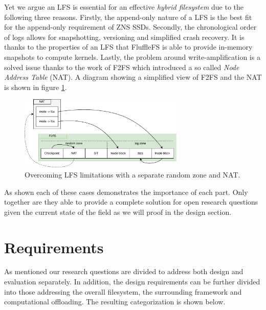 Yet we argue an LFS is essential for an effective \textit{hybrid filesystem} due
to the following three reasons. Firstly, the append-only nature of a LFS is the
best fit for the append-only requirement of ZNS SSDs. Secondly, the
chronological order of logs allows for snapshotting, versioning and simplified
crash recovery. It is thanks to the properties of an LFS that FluffleFS is able
to provide in-memory snapshots to compute kernels. Lastly, the problem around
write-amplification is a solved issue thanks to the work of F2FS
\cite{Lee2015F2FSAN} which introduced a so called \textit{Node Address Table}
(NAT). A diagram showing a simplified view of F2FS and the NAT is shown in
figure \ref{figure:f2fsnat}.

\begin{figure}
    \centering
	\includegraphics[width=0.7\textwidth]{resources/images/f2fs-nat.pdf}
	\caption{Overcoming LFS limitations with a separate random zone and NAT.}
    \label{figure:f2fsnat}
\end{figure}

As shown each of these cases demonstrates the importance of each part. Only
together are they able to provide a complete solution for open research
questions given the current state of the field as we will proof in the design
section.

\section{Requirements}

As mentioned our research questions are divided to address both design and
evaluation separately. In addition, the design requirements can be further
divided into those addressing the overall filesystem, the surrounding
framework and computational offloading. The resulting categorization is shown
below.


